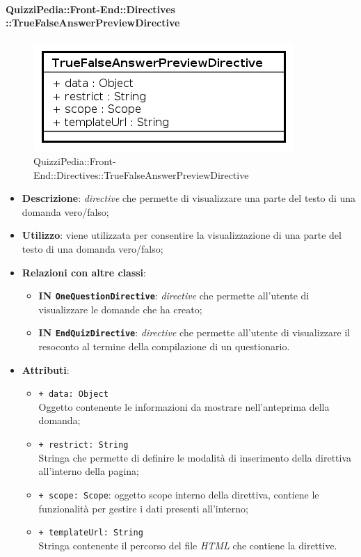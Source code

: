 	\paragraph{QuizziPedia::Front-End::Directives\\::TrueFalseAnswerPreviewDirective}
		
		\label{QuizziPedia::Front-End::Directives::TrueFalseAnswerPreviewDirective}
		
		\begin{figure}[ht]
			\centering
			\includegraphics[scale=0.80,keepaspectratio]{UML/Classi/Front-End/QuizziPedia_Front-end_Directives_TrueFalseAnswerPreviewDirective.png}
			\caption{QuizziPedia::Front-End::Directives::TrueFalseAnswerPreviewDirective}
		\end{figure} \FloatBarrier
		
		\begin{itemize}
			\item \textbf{Descrizione}: \textit{directive} che permette di visualizzare una parte del testo di una domanda vero/falso;
			\item \textbf{Utilizzo}: viene utilizzata per consentire la visualizzazione di una parte del testo di una domanda vero/falso;
			\item \textbf{Relazioni con altre classi}: 
			\begin{itemize}
				\item \textbf{IN \texttt{OneQuestionDirective}}: \textit{directive} che permette all'utente di visualizzare le domande che ha creato;
				\item \textbf{IN \texttt{EndQuizDirective}}: \textit{directive} che permette all'utente di visualizzare il resoconto al termine della compilazione di un questionario.
			\end{itemize}
			\item \textbf{Attributi}:
			\begin{itemize}
				\item \texttt{+ data: Object} \\ Oggetto contenente le informazioni da mostrare nell'anteprima della domanda;
		\item \texttt{+ restrict: String} \\ Stringa che permette di definire le modalità di inserimento della direttiva all'interno della pagina;
		\item \texttt{+ scope: Scope}: oggetto scope interno della direttiva, contiene le funzionalità per gestire i dati presenti all'interno;
		\item \texttt{+ templateUrl: String} \\ Stringa contenente il percorso del file \textit{HTML} che contiene la direttive.
			\end{itemize}
		\end{itemize}